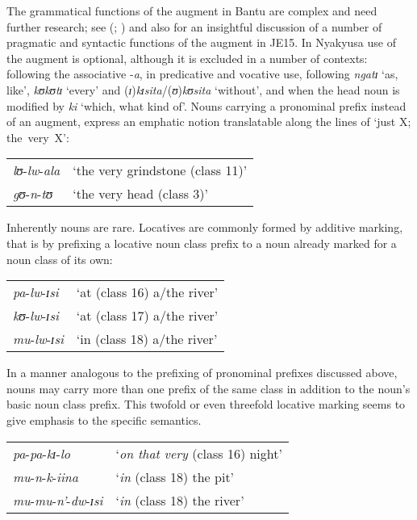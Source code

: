 The grammatical functions of the augment in Bantu are complex and need further research; see \citeauthor{HymanLKatambaF1991} (\citeyear{HymanLKatambaF1991}; \citeyear{HymanLKatambaF1993}) and also \citet{VanDerWalJNamyaloS2015} for an insightful discussion of a number of pragmatic and syntactic functions of the augment in  JE15. In Nyakyusa use of the augment is optional, although it is excluded in a number of contexts: following the associative -\textit{a}, in predicative and vocative use, following \textit{ngatɪ} `as, like', \textit{kʊkʊtɪ} `every' and (\textit{ɪ})\textit{kɪsita}/(\textit{ʊ})\textit{kʊsita} \lq without', and when the head noun is modified by \textit{ki} `which, what kind of'. Nouns carrying a pronominal prefix instead of an augment, express an emphatic notion translatable along the lines of `just X; \mbox{the very X}':

\begin{exe}
	\ex\begin{tabular}[t]{ll}
		\textit{lʊ}-\textit{lw}-\textit{ala} & `the very grindstone (class 11)'\\
		\textit{gʊ}-\textit{n}-\textit{tʊ} & `the very head (class 3)'\\
	\end{tabular}
\end{exe}

Inherently  nouns are rare. Locatives are commonly formed by additive marking, that is by prefixing a locative noun class prefix to a noun already marked for a noun class of its own:
\begin{exe}
	\ex \label{exLocativeNouns}
	\begin{tabular}[t]{ll}
		\textit{pa}-\textit{lw}-\textit{ɪsi} & `at (class 16) a/the river'\\
		\textit{kʊ}-\textit{lw}-\textit{ɪsi} & `at (class 17) a/the river'\\
		\textit{mu}-\textit{lw}-\textit{ɪsi} & `in (class 18) a/the river'\\
	\end{tabular}
\end{exe}

In a manner analogous to the prefixing of pronominal prefixes discussed above,  nouns may carry more than one prefix of the same  class in addition to the noun's basic noun class prefix. This twofold or even threefold locative marking seems to give emphasis to the specific  semantics.
\begin{exe}
	\ex
	\begin{tabular}[t]{ll}
		\textit{pa}-\textit{pa}-\textit{kɪ}-\textit{lo} & `\textit{on that very} (class 16) night'
		\\\textit{mu}-\textit{n}-\textit{k}-\textit{iina} &  `\textit{in} (class 18) the pit'
		\\\textit{mu}-\textit{mu}-\textit{n'}-\textit{dw}-\textit{ɪsi} & \lq \textit{in} (class 18) the river'
	\end{tabular}
\end{exe}

